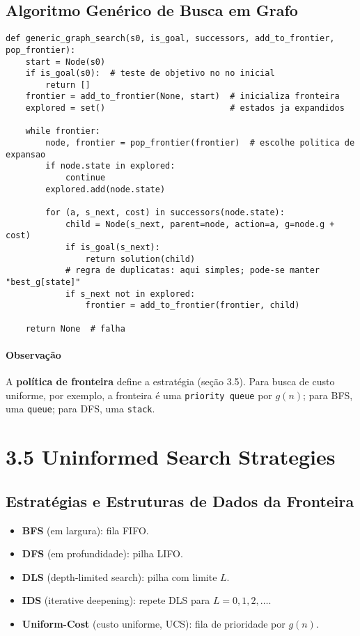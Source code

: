\documentclass[9pt,a4paper]{extarticle}
\begin{document}
\subsection*{Algoritmo Genérico de Busca em Grafo}
\begin{lstlisting}
def generic_graph_search(s0, is_goal, successors, add_to_frontier, pop_frontier):
    start = Node(s0)
    if is_goal(s0):  # teste de objetivo no no inicial
        return []
    frontier = add_to_frontier(None, start)  # inicializa fronteira
    explored = set()                         # estados ja expandidos

    while frontier:
        node, frontier = pop_frontier(frontier)  # escolhe politica de expansao
        if node.state in explored:
            continue
        explored.add(node.state)

        for (a, s_next, cost) in successors(node.state):
            child = Node(s_next, parent=node, action=a, g=node.g + cost)
            if is_goal(s_next):
                return solution(child)
            # regra de duplicatas: aqui simples; pode-se manter "best_g[state]"
            if s_next not in explored:
                frontier = add_to_frontier(frontier, child)

    return None  # falha
\end{lstlisting}

\paragraph{Observação} A \textbf{política de fronteira} define a estratégia (seção 3.5). Para busca de custo uniforme, por exemplo, a fronteira é uma \texttt{priority queue} por $g(n)$; para BFS, uma \texttt{queue}; para DFS, uma \texttt{stack}.

\section{3.5 Uninformed Search Strategies}
\subsection*{Estratégias e Estruturas de Dados da Fronteira}
\begin{itemize}
  \item \textbf{BFS} (em largura): fila FIFO.
  \item \textbf{DFS} (em profundidade): pilha LIFO.
  \item \textbf{DLS} (depth-limited search): pilha com limite $L$.
  \item \textbf{IDS} (iterative deepening): repete DLS para $L=0,1,2,\dots$.
  \item \textbf{Uniform-Cost} (custo uniforme, UCS): fila de prioridade por $g(n)$.
\end{itemize}
\end{document}
